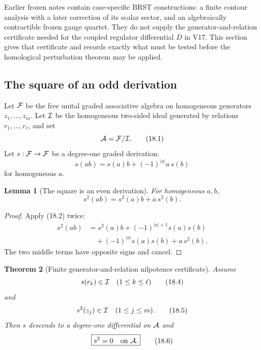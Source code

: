 \documentclass[11pt]{article}
\newtheorem{theorem}{Theorem}[section]
\newtheorem{lemma}[theorem]{Lemma}
\theoremstyle{remark}
\begin{document}
Earlier frozen notes contain case-specific BRST constructions: a
finite contour analysis with a later correction of its scalar
sector, and an algebraically contractible frozen gauge quartet.  They
do not supply the generator-and-relation certificate needed for the
coupled regulator differential \(D\) in V17.  This section gives that
certificate and records exactly what must be tested before the
homological perturbation theorem may be applied.

\subsection{The square of an odd derivation}

Let \({\cal F}\) be the free unital graded associative algebra on
homogeneous generators \(z_1,\ldots,z_m\).  Let \({\cal I}\) be the
homogeneous two-sided ideal generated by relations
\(r_1,\ldots,r_\ell\), and set
\[
                         {\cal A}={\cal F}/{\cal I}.         \tag{18.1}
\]
Let \(s:{\cal F}\to{\cal F}\) be a degree-one graded derivation:
\[
 s(ab)=s(a)b+(-1)^{|a|}a\,s(b)                             \tag{18.2}
\]
for homogeneous \(a\).

\begin{lemma}[The square is an even derivation]
\label{lem:v12v18-even}
For homogeneous \(a,b\),
\[
                         s^2(ab)=s^2(a)b+a\,s^2(b).         \tag{18.3}
\]
\end{lemma}

\begin{proof}
Apply (18.2) twice:
\[
\begin{split}
 s^2(ab)
 &=s^2(a)b+(-1)^{|a|+1}s(a)s(b)\\
 &\quad+(-1)^{|a|}s(a)s(b)+a\,s^2(b).
\end{split}
\]
The two middle terms have opposite signs and cancel.
\end{proof}

\begin{theorem}[Finite generator-and-relation nilpotence
certificate]
\label{thm:v12v18-certificate}
Assume
\[
                         s(r_k)\in{\cal I}
 \quad(1\le k\le\ell)                                      \tag{18.4}
\]
and
\[
                         s^2(z_j)\in{\cal I}
 \quad(1\le j\le m).                                       \tag{18.5}
\]
Then \(s\) descends to a degree-one differential on \({\cal A}\) and
\[
                         \boxed{s^2=0\quad\hbox{on }{\cal A}.}
                                                               \tag{18.6}
\]
\end{theorem}
\end{document}
